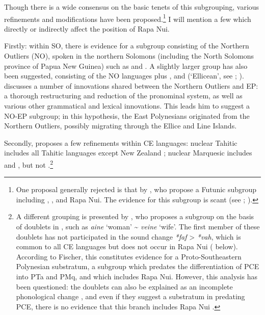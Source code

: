 Though there is a wide consensus on the basic tenets of this subgrouping, various refinements and modifications have been proposed.\footnote{\label{fn:13}One proposal generally rejected is that by \citet{LangdonTryon1983}, who propose a Futunic subgroup including , ,  and Rapa Nui. The evidence for this subgroup is scant (see \citealt{Clark1983Review}; \citealt{Green1985}).} I will mention a few which directly or indirectly affect the position of Rapa Nui.

Firstly: within SO, there is evidence for a subgroup consisting of the Northern Outliers (NO), spoken in the northern Solomons (including the North Solomons province of Papua New Guinea) such as  and . A slightly larger group has also been suggested, consisting of the NO languages plus ,  and  (‘Ellicean’, see \citealt{Howard1981}; \citealt{Pawley2009}). \citet{Wilson1985,Wilson2012} discusses a number of innovations shared between the Northern Outliers and EP: a thorough restructuring and reduction of the pronominal system, as well as various other grammatical and lexical innovations. This leads him to suggest a NO-EP subgroup; in this hypothesis, the East Polynesians originated from the Northern Outliers, possibly migrating through the Ellice and Line Islands.

Secondly, \citet{Marck1996Subgrouping,Marck2000} proposes a few refinements within CE languages: nuclear Tahitic includes all Tahitic languages except New Zealand ; nuclear Marquesic includes  and , but not .\footnote{\label{fn:14}A different grouping is presented by \citet{Fischer2001Doublets}, who proposes a subgroup on the basis of doublets in , such as \textit{{\ꞌ}a{\ꞌ}ine} ‘woman’ {\textasciitilde} \textit{ve{\ꞌ}ine} ‘wife’. The first member of these doublets has not participated in the sound change \textit{*faf} {\textgreater} \textit{*vah}, which is common to all CE languages but does not occur in Rapa Nui ( below). According to Fischer, this constitutes evidence for a Proto-Southeastern Polynesian substratum, a subgroup which predates the differentiation of PCE into PTa and PMq, and which includes Rapa Nui. However, this analysis has been questioned: the doublets can also be explained as an incomplete phonological change \citep{Rutter2002}, and even if they suggest a substratum in  predating PCE, there is no evidence that this branch includes Rapa Nui \citep{Marck2002}.}

